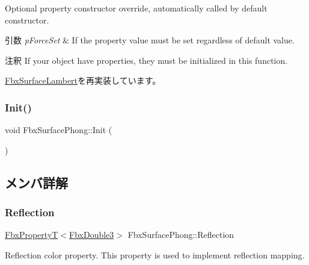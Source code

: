 Optional property constructor override, automatically called by default constructor. 
\begin{DoxyParams}{引数}
{\em p\+Force\+Set} & If the property value must be set regardless of default value. \\
\hline
\end{DoxyParams}
\begin{DoxyRemark}{注釈}
If your object have properties, they must be initialized in this function. 
\end{DoxyRemark}


\hyperlink{class_fbx_surface_lambert_a6693e1c08050978c78eece2aa48688e9}{Fbx\+Surface\+Lambert}を再実装しています。

\mbox{\label{class_fbx_surface_phong_af594d25056c03cd67396191c7d480098}} 
\subsubsection{\texorpdfstring{Init()}{Init()}}
{\footnotesize\ttfamily void Fbx\+Surface\+Phong\+::\+Init (\begin{DoxyParamCaption}{ }\end{DoxyParamCaption})\hspace{0.3cm}{\ttfamily [protected]}}



\subsection{メンバ詳解}
\mbox{\label{class_fbx_surface_phong_a67159f889406ad672d13e463e840a9ba}} 
\subsubsection{\texorpdfstring{Reflection}{Reflection}}
{\footnotesize\ttfamily \hyperlink{class_fbx_property_t}{Fbx\+PropertyT}$<$\hyperlink{fbxtypes_8h_ae0a96f14cde566774c7553aa7523b7a7}{Fbx\+Double3}$>$ Fbx\+Surface\+Phong\+::\+Reflection}

Reflection color property. This property is used to implement reflection mapping. \mbox{\label{class_fbx_surface_phong_a87608ae7193bbac4f63c97f6c5f1dee2}} 
